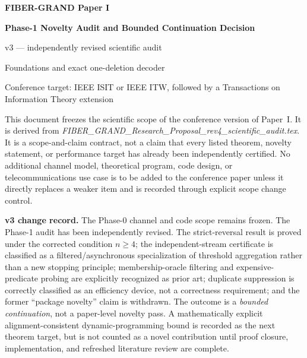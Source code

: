 \documentclass[11pt]{article}
\theoremstyle{definition}
\theoremstyle{remark}
\begin{document}
\begin{center}
{\sffamily\bfseries\color{navy}\fontsize{25}{29}\selectfont FIBER-GRAND Paper I}\par
\vspace{0.12in}
{\sffamily\bfseries\color{blue}\fontsize{17}{21}\selectfont Phase-1 Novelty Audit and Bounded Continuation Decision}\par
\vspace{0.10in}
{\sffamily\color{graytext}\fontsize{12}{15}\selectfont v3 --- independently revised scientific audit}\par
\vspace{0.18in}
{\large Foundations and exact one-deletion decoder}\par
\vspace{0.15in}
{\small Conference target: IEEE ISIT or IEEE ITW, followed by a Transactions on Information Theory extension}\par
\end{center}

\begin{freezebox}
This document freezes the scientific scope of the conference version of Paper~I. It is derived from
\emph{FIBER\_GRAND\_Research\_Proposal\_rev4\_scientific\_audit.tex}. It is a scope-and-claim contract, not a claim that every listed theorem, novelty statement, or performance target has already been independently certified. No additional channel model, theoretical program, code design, or telecommunications use case is to be added to the conference paper unless it directly replaces a weaker item and is recorded through explicit scope change control.

\textbf{v3 change record.} The Phase-0 channel and code scope remains frozen. The Phase-1 audit has been independently revised. The strict-reversal result is proved under the corrected condition $n\ge4$; the independent-stream certificate is classified as a filtered/asynchronous specialization of threshold aggregation rather than a new stopping principle; membership-oracle filtering and expensive-predicate probing are explicitly recognized as prior art; duplicate suppression is correctly classified as an efficiency device, not a correctness requirement; and the former ``package novelty'' claim is withdrawn. The outcome is a \emph{bounded continuation}, not a paper-level novelty pass. A mathematically explicit alignment-consistent dynamic-programming bound is recorded as the next theorem target, but is not counted as a novel contribution until proof closure, implementation, and refreshed literature review are complete.
\end{freezebox}
\end{document}
